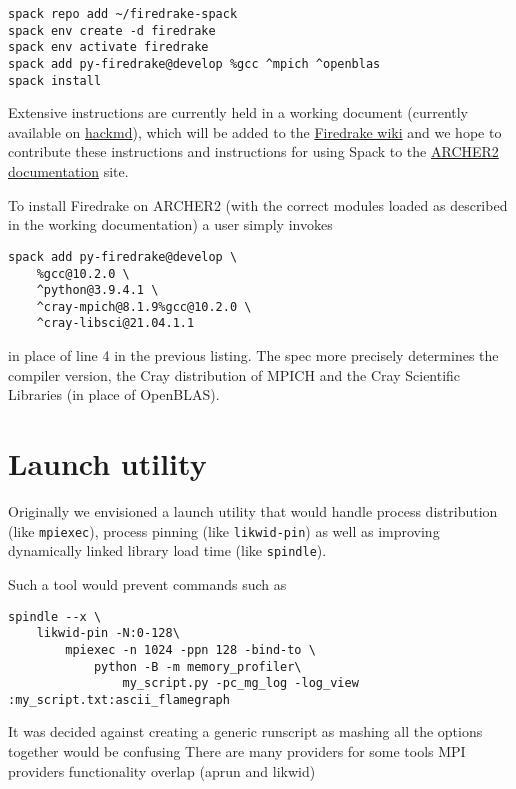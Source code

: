 \documentclass[a4paper,11pt]{article}
\begin{document}
\begin{lstlisting}
spack repo add ~/firedrake-spack
spack env create -d firedrake
spack env activate firedrake
spack add py-firedrake@develop %gcc ^mpich ^openblas
spack install
\end{lstlisting}

Extensive instructions are currently held in a working document (currently available on \href{https://hackmd.io/Sg3fYXuCTl61d_LAg4QnMw}{hackmd}), which will be added to the \href{https://github.com/firedrakeproject/firedrake/wiki}{Firedrake wiki} and we hope to contribute these instructions and instructions for using Spack to the \href{https://docs.archer2.ac.uk/}{ARCHER2 documentation} site.

To install Firedrake on ARCHER2 (with the correct modules loaded as described in the working documentation) a user simply invokes
\begin{lstlisting}
spack add py-firedrake@develop \
    %gcc@10.2.0 \
    ^python@3.9.4.1 \
    ^cray-mpich@8.1.9%gcc@10.2.0 \
    ^cray-libsci@21.04.1.1
\end{lstlisting}
in place of line 4 in the previous listing.
The spec more precisely determines the compiler version, the Cray distribution of MPICH and the Cray Scientific Libraries (in place of OpenBLAS).




\clearpage
\section{Launch utility}
\label{sec:launch}
Originally we envisioned a launch utility that would handle process distribution (like \verb`mpiexec`), process pinning (like \verb`likwid-pin`) as well as improving dynamically linked library load time (like \verb`spindle`).

Such a tool would prevent commands such as
\begin{lstlisting}
spindle --x \
    likwid-pin -N:0-128\
        mpiexec -n 1024 -ppn 128 -bind-to \
            python -B -m memory_profiler\
                my_script.py -pc_mg_log -log_view :my_script.txt:ascii_flamegraph
\end{lstlisting}

It was decided against creating a generic runscript as
mashing all the options together would be confusing
There are many providers for some tools MPI providers
functionality overlap (aprun and likwid)
\end{document}
